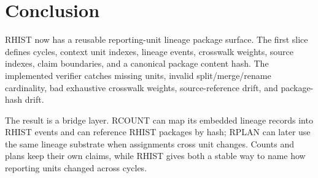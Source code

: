 \section{Conclusion}

RHIST now has a reusable reporting-unit lineage package surface. The first
slice defines cycles, context unit indexes, lineage events, crosswalk weights,
source indexes, claim boundaries, and a canonical package content hash. The
implemented verifier catches missing units, invalid split/merge/rename
cardinality, bad exhaustive crosswalk weights, source-reference drift, and
package-hash drift.

The result is a bridge layer. RCOUNT can map its embedded lineage records into
RHIST events and can reference RHIST packages by hash; RPLAN can later use the
same lineage substrate when assignments cross unit changes. Counts and plans
keep their own claims, while RHIST gives both a stable way to name how reporting
units changed across cycles.
